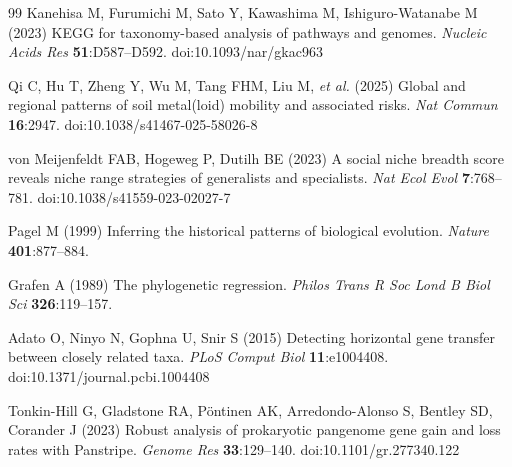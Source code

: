 \documentclass[11pt]{article}
\begin{document}
\begin{thebibliography}{99}
Kanehisa M, Furumichi M, Sato Y, Kawashima M, Ishiguro-Watanabe M
(2023) KEGG for taxonomy-based analysis of pathways and genomes.
\textit{Nucleic Acids Res} \textbf{51}:D587--D592.
doi:10.1093/nar/gkac963

Qi C, Hu T, Zheng Y, Wu M, Tang FHM, Liu M, \textit{et al.} (2025) Global
and regional patterns of soil metal(loid) mobility and associated risks.
\textit{Nat Commun} \textbf{16}:2947. doi:10.1038/s41467-025-58026-8

von Meijenfeldt FAB, Hogeweg P, Dutilh BE (2023) A social niche breadth
score reveals niche range strategies of generalists and specialists.
\textit{Nat Ecol Evol} \textbf{7}:768--781. doi:10.1038/s41559-023-02027-7

Pagel M (1999) Inferring the historical patterns of biological evolution.
\textit{Nature} \textbf{401}:877--884.

Grafen A (1989) The phylogenetic regression.
\textit{Philos Trans R Soc Lond B Biol Sci} \textbf{326}:119--157.

Adato O, Ninyo N, Gophna U, Snir S (2015) Detecting horizontal gene transfer
between closely related taxa. \textit{PLoS Comput Biol} \textbf{11}:e1004408.
doi:10.1371/journal.pcbi.1004408

Tonkin-Hill G, Gladstone RA, P\"{o}ntinen AK, Arredondo-Alonso S, Bentley SD,
Corander J (2023) Robust analysis of prokaryotic pangenome gene gain and loss
rates with Panstripe. \textit{Genome Res} \textbf{33}:129--140.
doi:10.1101/gr.277340.122

\end{thebibliography}
\end{document}
